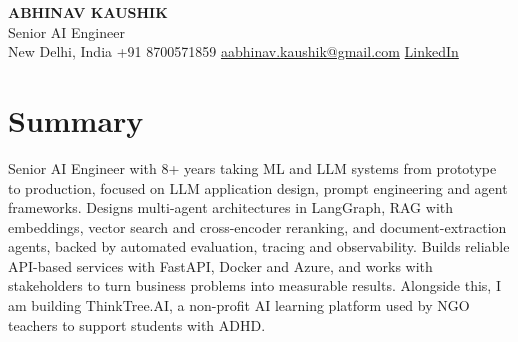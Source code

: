 \documentclass[10pt,a4paper]{article}
\begin{document}
\begin{center}
  {\LARGE\bfseries ABHINAV KAUSHIK}\\[2pt]
  {\large Senior AI Engineer}\\[2pt]
  New Delhi, India \textbar{} +91 8700571859 \textbar{} \href{mailto:aabhinav.kaushik@gmail.com}{aabhinav.kaushik@gmail.com} \textbar{} \href{https://www.linkedin.com/in/abhinav-kaushik10/}{LinkedIn}  
\end{center}

\section{Summary}
Senior AI Engineer with 8+ years taking ML and LLM systems from prototype to production, focused on LLM application design, prompt engineering and agent frameworks. Designs multi-agent architectures in LangGraph, RAG with embeddings, vector search and cross-encoder reranking, and document-extraction agents, backed by automated evaluation, tracing and observability. Builds reliable API-based services with FastAPI, Docker and Azure, and works with stakeholders to turn business problems into measurable results. Alongside this, I am building ThinkTree.AI, a non-profit AI learning platform used by NGO teachers to support students with ADHD.
\end{document}
